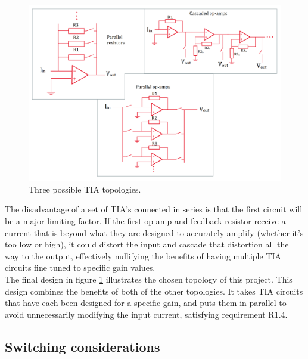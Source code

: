 \documentclass[conference]{IEEEtran}
\begin{document}
\begin{figure}
    \centering
    \includegraphics[width=0.8\linewidth]{TopologiesV3.png}
    \caption{Three possible TIA topologies.}
    \label{fig:3}
\end{figure}

The disadvantage of a set of TIA’s connected in series is that the first circuit will be a major limiting factor. If the first op-amp and feedback resistor receive a current that is beyond what they are designed to accurately amplify (whether it’s too low or high), it could distort the input and cascade that distortion all the way to the output, effectively nullifying the benefits of having multiple TIA circuits fine tuned to specific gain values. \\

The final design in figure \ref{fig:3} illustrates the chosen topology of this project. This design combines the benefits of both of the other topologies. It takes TIA circuits that have each been designed for a specific gain, and puts them in parallel to avoid unnecessarily modifying the input current, satisfying requirement R1.4. \\

\subsection{Switching considerations}
\end{document}
